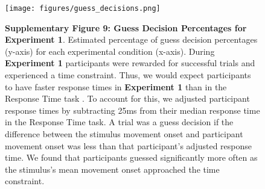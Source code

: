 \documentclass[12pt]{article}
\newcommand\boldblue[1]{\textcolor{mydarkblue}{\textbf{#1}}}
\begin{document}
\begin{figure}[H]
    \centering
    \texttt{[image: figures/guess\_decisions.png]}

    \caption*{\boldblue{Supplementary Figure 9: Guess Decision Percentages for Experiment 1}. 
    Estimated percentage of guess decision percentages (y-axis) for each experimental condition (x-axis). During \boldblue{Experiment 1} participants were rewarded for successful trials and experienced a time constraint. Thus, we would expect participants to have faster response times in \boldblue{Experiment 1} than in the Response Time task \autocite*{milsteinInfluenceExpectedValue2007,shadmehrMovementVigorReflection2019a}. To account for this, we adjusted participant response times by subtracting 25ms from their median response time in the Response Time task. A trial was a guess decision if the difference between the stimulus movement onset and participant movement onset was less than that participant’s adjusted response time. We found that participants guessed significantly more often as the stimulus’s mean movement onset approached the time constraint.}
\end{figure}


\end{document}
